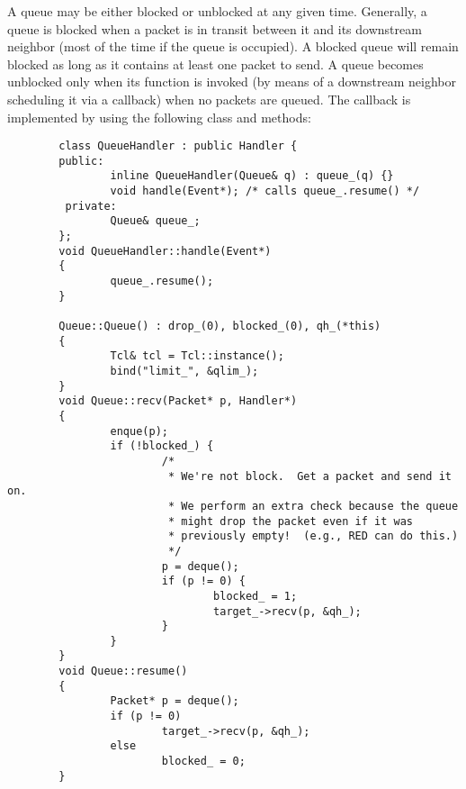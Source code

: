 A queue may be either blocked or unblocked at any given time.
Generally, a queue is blocked when a packet is in transit between it
and its downstream neighbor (most of the time if the queue is occupied).
A blocked queue will remain blocked as long as it contains at least
one packet to send.
A queue becomes unblocked only when its  function is
invoked (by means of a downstream neighbor scheduling it via
a callback) when no packets are queued.
The callback is implemented by using the following class and
methods:
\begin{small}
\begin{verbatim}
        class QueueHandler : public Handler {
        public:
                inline QueueHandler(Queue& q) : queue_(q) {}
                void handle(Event*); /* calls queue_.resume() */
         private:
                Queue& queue_;
        };
        void QueueHandler::handle(Event*)
        {
                queue_.resume();
        }

        Queue::Queue() : drop_(0), blocked_(0), qh_(*this)
        {
                Tcl& tcl = Tcl::instance();
                bind("limit_", &qlim_);
        }
        void Queue::recv(Packet* p, Handler*)
        {
                enque(p);
                if (!blocked_) {
                        /*
                         * We're not block.  Get a packet and send it on.
                         * We perform an extra check because the queue
                         * might drop the packet even if it was
                         * previously empty!  (e.g., RED can do this.)
                         */
                        p = deque();
                        if (p != 0) {
                                blocked_ = 1;
                                target_->recv(p, &qh_);
                        }
                }
        }
        void Queue::resume()
        {
                Packet* p = deque();
                if (p != 0)
                        target_->recv(p, &qh_);
                else
                        blocked_ = 0;
        }
\end{verbatim}
\end{small}


